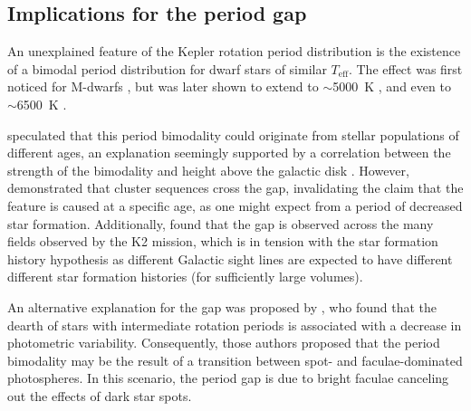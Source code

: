 \documentclass[trackchanges,twocolumn]{aastex631}
\newcommand{\teff}{\ensuremath{T_{\mathrm{eff}}}\xspace}
\begin{document}
\subsection{Implications for the period gap} \label{subsec:gap}

An unexplained feature of the Kepler rotation period distribution is the existence of a bimodal period distribution for dwarf stars of similar \teff. The effect was first noticed for M-dwarfs \citep{McQuillan2013b}, but was later shown to extend to $\sim$5000~K \citep{Reinhold2013, McQuillan2014, ReinholdHekker2020}, and even to $\sim$6500~K \citep{Davenport2017}. 

\citet{McQuillan2013b, McQuillan2014} speculated that this period bimodality could originate from stellar populations of different ages, an explanation seemingly supported by a correlation between the strength of the bimodality and height above the galactic disk \citep{DavenportCovey2018}. However, \citet{Curtis2020} demonstrated that cluster sequences cross the gap, invalidating the claim that the feature is caused at a specific age, as one might expect from a period of decreased star formation. Additionally, \citet{Gordon2021} found that the gap is observed across the many fields observed by the K2 mission, which is in tension with the star formation history hypothesis as different Galactic sight lines are expected to have different different star formation histories (for sufficiently large volumes). 

An alternative explanation for the gap was proposed by \citet{Reinhold2019}, who found that the dearth of stars with intermediate rotation periods is associated with a decrease in photometric variability. Consequently, those authors proposed that the period bimodality may be the result of a transition between spot- and faculae-dominated photospheres. In this scenario, the period gap is due to bright faculae canceling out the effects of dark star spots. 
\end{document}
